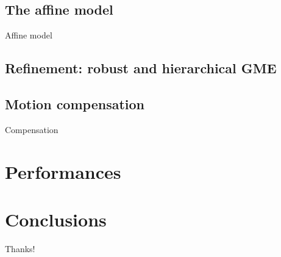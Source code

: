\documentclass[aspectratio=1610,xcolor=dvipsnames]{beamer}
\begin{document}
\subsection{The affine model}
\begin{frame}{Affine model}
    
\end{frame}

\subsection{Refinement: robust and hierarchical GME}
\subsection{Motion compensation}
\begin{frame}{Compensation}
    
\end{frame}

\section{Performances}

\section{Conclusions}

\begin{frame}
    \begin{center}
        {\Huge\calligra Thanks!}
    \end{center}
\end{frame}
\end{document}
